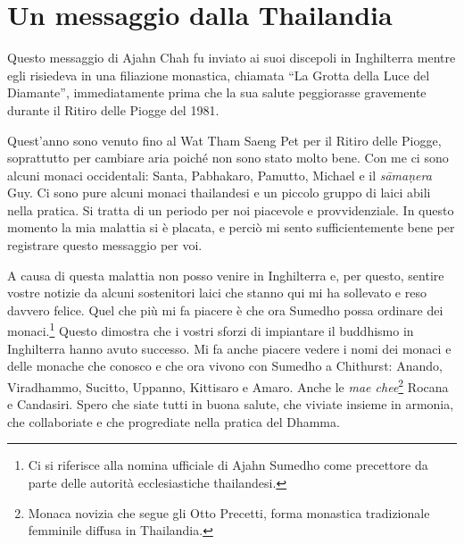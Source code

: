 \chapter{Un messaggio dalla Thailandia}

\begin{openingQuote}
  \centering

  Questo messaggio di Ajahn Chah fu inviato ai suoi discepoli in Inghilterra
  mentre egli risiedeva in una filiazione monastica, chiamata ``La Grotta della
  Luce del Diamante'', immediatamente prima che la sua salute peggiorasse
  gravemente durante il Ritiro delle Piogge del 1981.
\end{openingQuote}

Quest'anno sono venuto fino al Wat Tham Saeng Pet per il Ritiro delle
Piogge, soprattutto per cambiare aria poiché non sono stato molto bene.
Con me ci sono alcuni monaci occidentali: Santa, Pabhakaro, Pamutto,
Michael e il \emph{sāmaṇera} Guy. Ci sono pure alcuni monaci thailandesi
e un piccolo gruppo di laici abili nella pratica. Si tratta di un
periodo per noi piacevole e provvidenziale. In questo momento la mia
malattia si è placata, e perciò mi sento sufficientemente bene per
registrare questo messaggio per voi.

A causa di questa malattia non posso venire in Inghilterra e, per
questo, sentire vostre notizie da alcuni sostenitori laici che stanno
qui mi ha sollevato e reso davvero felice. Quel che più mi fa piacere è
che ora Sumedho possa ordinare dei monaci.\footnote{Ci si riferisce alla
  nomina ufficiale di Ajahn Sumedho come precettore da parte delle
  autorità ecclesiastiche thailandesi.} Questo dimostra che i vostri
sforzi di impiantare il buddhismo in Inghilterra hanno avuto successo.
Mi fa anche piacere vedere i nomi dei monaci e delle monache che conosco
e che ora vivono con Sumedho a Chithurst: Anando, Viradhammo, Sucitto,
Uppanno, Kittisaro e Amaro. Anche le \emph{mae chee}\footnote{Monaca
  novizia che segue gli Otto Precetti, forma monastica tradizionale
  femminile diffusa in Thailandia.} Rocana e Candasiri. Spero che siate
tutti in buona salute, che viviate insieme in armonia, che collaboriate
e che progrediate nella pratica del Dhamma.

